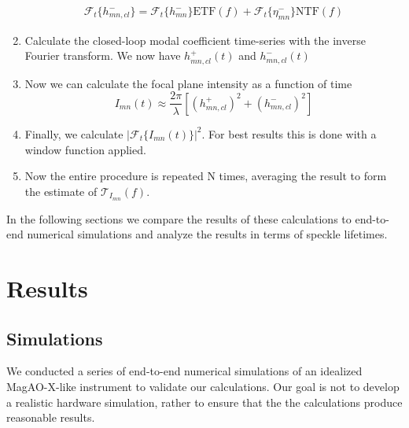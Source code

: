 \documentclass[10pt,preprint]{aastex631}
\begin{document}
\begin{enumerate}
\begin{eqnarray}
\mathcal{F}_t\{h_{mn,cl}^-\} = \mathcal{F}_t\{h_{mn}^-\} \mathrm{ETF}(f) + \mathcal{F}_t\{\eta_{mn}^-\} \mathrm{NTF}(f) \nonumber
\end{eqnarray}
\item Calculate the closed-loop modal coefficient time-series with the inverse Fourier transform.  We now have $h_{mn,cl}^+(t)$ and $h_{mn,cl}^-(t)$ 
\item Now we can calculate the focal plane intensity as a function of time
\begin{equation}
I_{mn}(t) \approx \frac{2\pi}{\lambda}\left[ \left(h_{mn,cl}^+\right)^2 + \left(h_{mn,cl}^-\right)^2 \right] 
\end{equation}
\item Finally, we calculate $|\mathcal{F}_t\{I_{mn}(t)\}|^2$.  For best results this is done with a window function applied.
\item Now the entire procedure is repeated N times, averaging the result to form the estimate of $\mathcal{T}_{I_{mn}}(f)$.
\end{enumerate}

In the following sections we compare the results of these calculations to end-to-end numerical simulations and analyze the results in terms of speckle lifetimes.

\afterpage{\clearpage}



\section{Results}
\label{sec:results}


\subsection{Simulations}
\label{sec:simulations}
We conducted a series of end-to-end numerical simulations of an idealized MagAO-X-like instrument to validate our calculations.  Our goal is not to develop a realistic hardware simulation, rather to ensure that the the calculations produce reasonable results. 
\end{document}
